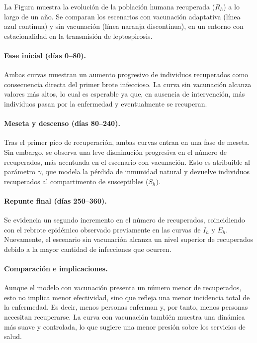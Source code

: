 \documentclass[12pt,a4paper]{article}
\begin{document}
La Figura muestra la evolución de la población humana recuperada ($R_h$) a lo largo de un año. Se comparan los escenarios con vacunación adaptativa (línea azul continua) y sin vacunación (línea naranja discontinua), en un entorno con estacionalidad en la transmisión de leptospirosis.

\paragraph{Fase inicial (días 0–80).} Ambas curvas muestran un aumento progresivo de individuos recuperados como consecuencia directa del primer brote infeccioso. La curva sin vacunación alcanza valores más altos, lo cual es esperable ya que, en ausencia de intervención, más individuos pasan por la enfermedad y eventualmente se recuperan.

\paragraph{Meseta y descenso (días 80–240).} Tras el primer pico de recuperación, ambas curvas entran en una fase de meseta. Sin embargo, se observa una leve disminución progresiva en el número de recuperados, más acentuada en el escenario con vacunación. Esto es atribuible al parámetro $\gamma$, que modela la pérdida de inmunidad natural y devuelve individuos recuperados al compartimento de susceptibles ($S_h$).

\paragraph{Repunte final (días 250–360).} Se evidencia un segundo incremento en el número de recuperados, coincidiendo con el rebrote epidémico observado previamente en las curvas de $I_h$ y $E_h$. Nuevamente, el escenario sin vacunación alcanza un nivel superior de recuperados debido a la mayor cantidad de infecciones que ocurren.

\paragraph{Comparación e implicaciones.} Aunque el modelo con vacunación presenta un número menor de recuperados, esto no implica menor efectividad, sino que refleja una menor incidencia total de la enfermedad. Es decir, menos personas enferman y, por tanto, menos personas necesitan recuperarse. La curva con vacunación también muestra una dinámica más suave y controlada, lo que sugiere una menor presión sobre los servicios de salud.
\end{document}
